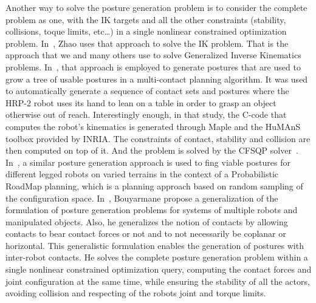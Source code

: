 Another way to solve the posture generation problem is to consider the complete problem as one, with the IK targets and all the other constraints (stability, collisions, toque limits, etc\ldots) in a single nonlinear constrained optimization problem.
In~\cite{Zhao1994}, Zhao uses that approach to solve the IK problem.
That is the approach that we and many others use to solve Generalized Inverse Kinematics problems.
In~\cite{escande:iros:2006}, that approach is employed to generate postures that are used to grow a tree of usable postures in a multi-contact planning algorithm. It was used to automatically generate a sequence of contact sets and postures where the HRP-2 robot uses its hand to lean on a table in order to grasp an object otherwise out of reach.
Interestingly enough, in that study, the C-code that computes the robot's kinematics is generated through Maple and the HuMAnS toolbox provided by INRIA.
The constraints of contact, stability and collision are then computed on top of it.
And the problem is solved by the CFSQP solver~\cite{cfsqp:manual}.
In~\cite{hauser:ijrr:2008}, a similar posture generation approach is used to fing viable postures for different legged robots on varied terrains in the context of a Probabilistic RoadMap planning, which is a planning approach based on random sampling of the configuration space.
In~\cite{bouyarmane2010static}, Bouyarmane propose a generalization of the formulation of posture generation problems for systems of multiple robots and manipulated objects.
Also, he generalizes the notion of contacts by allowing contacts to bear contact forces or not and to not necessarily be coplanar or horizontal.
This generalistic formulation enables the generation of postures with inter-robot contacts.
He solves the complete posture generation problem within a single nonlinear constrained optimization query, computing the contact forces and joint configuration at the same time, while ensuring the stability of all the actors, avoiding collision and respecting of the robots joint and torque limits.

